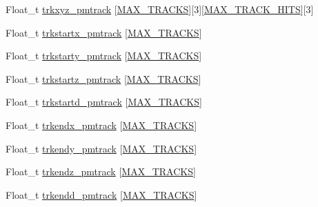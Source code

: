 \begin{DoxyCompactItemize}
\item 
Float\-\_\-t \hyperlink{classanatree_a42c839c1c99525e55acb300dd0a7b0be}{trkxyz\-\_\-pmtrack} \mbox{[}\hyperlink{anatree__core__v09410002_8h_a327fd4e796e4a0d78947524c96e4362e}{M\-A\-X\-\_\-\-T\-R\-A\-C\-K\-S}\mbox{]}\mbox{[}3\mbox{]}\mbox{[}\hyperlink{anatree__core__v09410002_8h_ae75eb9050f16aa034339f05572523070}{M\-A\-X\-\_\-\-T\-R\-A\-C\-K\-\_\-\-H\-I\-T\-S}\mbox{]}\mbox{[}3\mbox{]}
\item 
Float\-\_\-t \hyperlink{classanatree_ac4b2584b457cd867da7be50a679c8f92}{trkstartx\-\_\-pmtrack} \mbox{[}\hyperlink{anatree__core__v09410002_8h_a327fd4e796e4a0d78947524c96e4362e}{M\-A\-X\-\_\-\-T\-R\-A\-C\-K\-S}\mbox{]}
\item 
Float\-\_\-t \hyperlink{classanatree_a8140ac679883315316eb95cc748aa834}{trkstarty\-\_\-pmtrack} \mbox{[}\hyperlink{anatree__core__v09410002_8h_a327fd4e796e4a0d78947524c96e4362e}{M\-A\-X\-\_\-\-T\-R\-A\-C\-K\-S}\mbox{]}
\item 
Float\-\_\-t \hyperlink{classanatree_a2d904b0ad8a98f7245433c628217ac6c}{trkstartz\-\_\-pmtrack} \mbox{[}\hyperlink{anatree__core__v09410002_8h_a327fd4e796e4a0d78947524c96e4362e}{M\-A\-X\-\_\-\-T\-R\-A\-C\-K\-S}\mbox{]}
\item 
Float\-\_\-t \hyperlink{classanatree_a2af29172d88ef0b43764c732407fd920}{trkstartd\-\_\-pmtrack} \mbox{[}\hyperlink{anatree__core__v09410002_8h_a327fd4e796e4a0d78947524c96e4362e}{M\-A\-X\-\_\-\-T\-R\-A\-C\-K\-S}\mbox{]}
\item 
Float\-\_\-t \hyperlink{classanatree_ac8c7003ec614768a8905c7a0dcde8c97}{trkendx\-\_\-pmtrack} \mbox{[}\hyperlink{anatree__core__v09410002_8h_a327fd4e796e4a0d78947524c96e4362e}{M\-A\-X\-\_\-\-T\-R\-A\-C\-K\-S}\mbox{]}
\item 
Float\-\_\-t \hyperlink{classanatree_ac3cfe62b4181f5d7341bec922338f2f0}{trkendy\-\_\-pmtrack} \mbox{[}\hyperlink{anatree__core__v09410002_8h_a327fd4e796e4a0d78947524c96e4362e}{M\-A\-X\-\_\-\-T\-R\-A\-C\-K\-S}\mbox{]}
\item 
Float\-\_\-t \hyperlink{classanatree_aeadd3b4d6ee38df809b78d3ef664b21a}{trkendz\-\_\-pmtrack} \mbox{[}\hyperlink{anatree__core__v09410002_8h_a327fd4e796e4a0d78947524c96e4362e}{M\-A\-X\-\_\-\-T\-R\-A\-C\-K\-S}\mbox{]}
\item 
Float\-\_\-t \hyperlink{classanatree_aeb2777b215ef5c6e3e51202f86773745}{trkendd\-\_\-pmtrack} \mbox{[}\hyperlink{anatree__core__v09410002_8h_a327fd4e796e4a0d78947524c96e4362e}{M\-A\-X\-\_\-\-T\-R\-A\-C\-K\-S}\mbox{]}
\item 

\end{DoxyCompactItemize}
